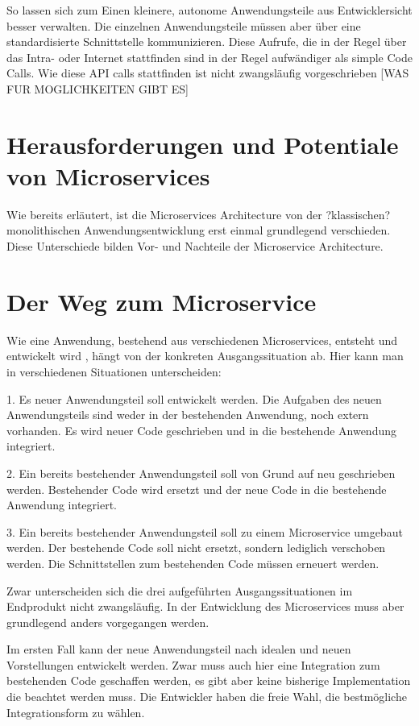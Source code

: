 So lassen sich zum Einen kleinere, autonome Anwendungsteile aus Entwicklersicht besser verwalten. Die einzelnen Anwendungsteile müssen aber über eine standardisierte Schnittstelle kommunizieren. Diese Aufrufe, die in der Regel über das Intra- oder Internet stattfinden sind in der Regel aufwändiger als simple Code Calls. Wie diese API calls stattfinden ist nicht zwangsläufig vorgeschrieben [WAS FUR MOGLICHKEITEN GIBT ES]


\section{Herausforderungen und Potentiale von Microservices}
Wie bereits erläutert, ist die Microservices Architecture von der ?klassischen? monolithischen Anwendungsentwicklung erst einmal grundlegend verschieden. Diese Unterschiede bilden Vor- und Nachteile der Microservice Architecture.

\section{Der Weg zum Microservice}
Wie eine Anwendung, bestehend aus verschiedenen Microservices, entsteht und entwickelt wird , hängt von der konkreten Ausgangssituation ab. Hier kann man in verschiedenen Situationen unterscheiden:

1. Es neuer Anwendungsteil soll entwickelt werden. Die Aufgaben des neuen Anwendungsteils sind weder in der bestehenden Anwendung, noch extern vorhanden. Es wird neuer Code geschrieben und in die bestehende Anwendung integriert.

2. Ein bereits bestehender Anwendungsteil soll von Grund auf neu geschrieben werden. Bestehender Code wird ersetzt und der neue Code in die bestehende Anwendung integriert.

3. Ein bereits bestehender Anwendungsteil soll zu einem Microservice umgebaut werden. Der bestehende Code soll nicht ersetzt, sondern lediglich verschoben werden. Die Schnittstellen zum bestehenden Code müssen erneuert werden.

Zwar unterscheiden sich die drei aufgeführten Ausgangssituationen im Endprodukt nicht zwangsläufig. In der Entwicklung des Microservices muss aber grundlegend anders vorgegangen werden. 

Im ersten Fall kann der neue Anwendungsteil nach idealen und neuen Vorstellungen entwickelt werden. Zwar muss auch hier eine Integration zum bestehenden Code geschaffen werden, es gibt aber keine bisherige Implementation die beachtet werden muss. Die Entwickler haben die freie Wahl, die bestmögliche Integrationsform zu wählen.

